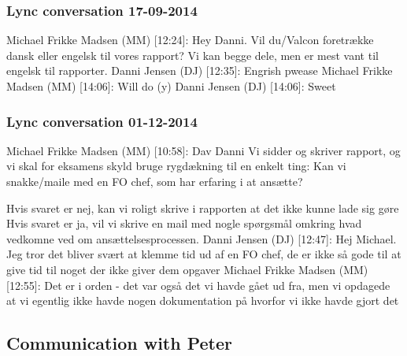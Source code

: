 \subsubsection{Lync conversation 17-09-2014}
Michael Frikke Madsen (MM) [12:24]: 
Hey Danni. Vil du/Valcon foretrække dansk eller engelsk til vores rapport?
Vi kan begge dele, men er mest vant til engelsk til rapporter. \newline
Danni Jensen (DJ) [12:35]: 
Engrish pwease \newline
Michael Frikke Madsen (MM) [14:06]: 
Will do (y) \newline
Danni Jensen (DJ) [14:06]: 
Sweet

\subsubsection{Lync conversation 01-12-2014}
Michael Frikke Madsen (MM) [10:58]: 
Dav Danni
Vi sidder og skriver rapport, og vi skal for eksamens skyld bruge rygdækning til en enkelt ting:
Kan vi snakke/maile med en FO chef, som har erfaring i at ansætte?

Hvis svaret er nej, kan vi roligt skrive i rapporten at det ikke kunne lade sig gøre
Hvis svaret er ja, vil vi skrive en mail med nogle spørgsmål omkring hvad vedkomne ved om ansættelsesprocessen. \newline
Danni Jensen (DJ) [12:47]: 
Hej Michael. Jeg tror det bliver svært at klemme tid ud af en FO chef, de er ikke så gode til at give tid til noget der ikke giver dem opgaver \newline
Michael Frikke Madsen (MM) [12:55]: 
Det er i orden - det var også det vi havde gået ud fra, men vi opdagede at vi egentlig ikke havde nogen dokumentation på hvorfor vi ikke havde gjort det \newline


\subsection{Communication with Peter}

